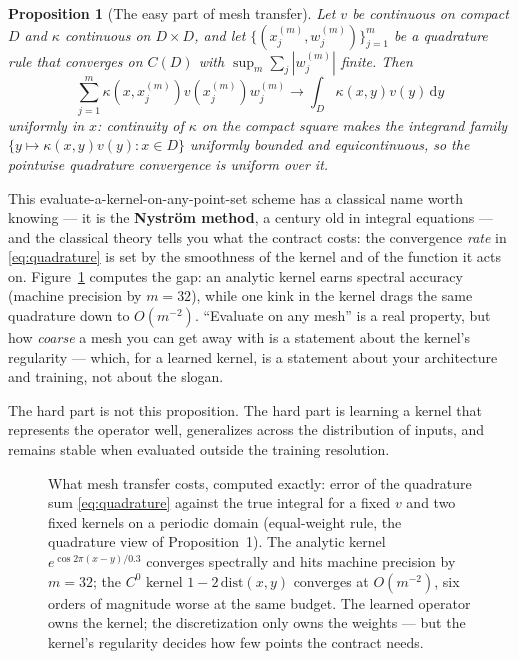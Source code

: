 \documentclass[10pt,a4paper]{article}
\newtheorem{proposition}{Proposition}
\newcommand{\dd}{\mathrm{d}}
\begin{document}
\begin{proposition}[The easy part of mesh transfer]
Let $v$ be continuous on compact $D$ and $\kappa$ continuous on
$D \times D$, and let $\{(x_j^{(m)},w_j^{(m)})\}_{j=1}^m$ be a quadrature
rule that converges on $C(D)$ with $\sup_m \sum_j |w_j^{(m)}|$ finite. Then
\[
  \sum_{j=1}^m \kappa(x,x_j^{(m)})v(x_j^{(m)})w_j^{(m)}
  \to
  \int_D \kappa(x,y)v(y)\,\dd y
\]
uniformly in $x$: continuity of $\kappa$ on the compact square makes the
integrand family $\{y \mapsto \kappa(x,y)v(y) : x \in D\}$ uniformly
bounded and equicontinuous, so the pointwise quadrature convergence is
uniform over it.
\end{proposition}

This evaluate-a-kernel-on-any-point-set scheme has a classical name worth
knowing --- it is the \textbf{Nystr\"om method}, a century old in integral
equations --- and the classical theory tells you what the contract costs:
the convergence \emph{rate} in \eqref{eq:quadrature} is set by the
smoothness of the kernel and of the function it acts on.
Figure~\ref{fig:quad} computes the gap: an analytic kernel earns spectral
accuracy (machine precision by $m = 32$), while one kink in the kernel
drags the same quadrature down to $O(m^{-2})$. ``Evaluate on any mesh'' is
a real property, but how \emph{coarse} a mesh you can get away with is a
statement about the kernel's regularity --- which, for a learned kernel,
is a statement about your architecture and training, not about the slogan.

The hard part is not this proposition. The hard part is learning a kernel
that represents the operator well, generalizes across the distribution of
inputs, and remains stable when evaluated outside the training resolution.

\begin{figure}[t]
\centering
{}
\caption{What mesh transfer costs, computed exactly: error of the
quadrature sum \eqref{eq:quadrature} against the true integral for a fixed
$v$ and two fixed kernels on a periodic domain (equal-weight rule, the
quadrature view of Proposition~1). The analytic kernel
$e^{\cos 2\pi(x-y)/0.3}$ converges spectrally and hits machine precision
by $m = 32$; the $C^0$ kernel $1 - 2\,\mathrm{dist}(x,y)$ converges at
$O(m^{-2})$, six orders of magnitude worse at the same budget. The learned
operator owns the kernel; the discretization only owns the weights ---
but the kernel's regularity decides how few points the contract needs.}
\label{fig:quad}
\end{figure}
\end{document}
